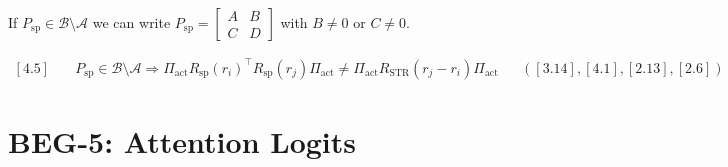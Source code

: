 \documentclass[11pt]{article}
\begin{document}
If $P_{\mathrm{sp}} \in \mathcal{B}\setminus\mathcal{A}$ we can write $P_{\mathrm{sp}} = \begin{bmatrix}A&B\\C&D\end{bmatrix}$ with $B \neq 0$ or $C \neq 0$.

\begin{align}
\boxed{[4.5]}\quad & P_{\mathrm{sp}} \in \mathcal{B}\setminus\mathcal{A} \Longrightarrow \Pi_{\mathrm{act}} R_{\mathrm{sp}}(r_i)^\top R_{\mathrm{sp}}(r_j) \Pi_{\mathrm{act}} \neq \Pi_{\mathrm{act}} R_{\mathrm{STR}}(r_j-r_i) \Pi_{\mathrm{act}} &&([3.14],[4.1],[2.13],[2.6])
\end{align}

\section{BEG-5: Attention Logits}
\end{document}
